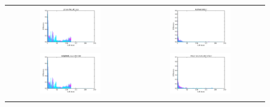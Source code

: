 \begin{figure}[h!]
\begin{tabular}{cc}
\includegraphics[width =0.5\textwidth]{images/thresh_cosine_glossaries_of_tags_distances} 		& \includegraphics[width =0.5\textwidth]{images/thresh_cosine_textvectorizer_distances} \\ \relax
\includegraphics[width =0.5\textwidth]{images/thresh_cosine_weighted_tagvectorizer_distances}	& \includegraphics[width =0.5\textwidth]{images/thresh_cosine_weighted_text_vectorizer_distances} \\ \relax

\end{tabular}
\end{figure}
